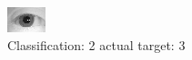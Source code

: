 \begin{figure}[h!]
\begin{center}
\includegraphics[width=0.60\columnwidth]{figures/ID1173_class_2_target_3.png}
\end{center}
\caption{ Classification: 2 actual target: 3}
\label{fig:ID1173_class_2_target_3}
\end{figure}
